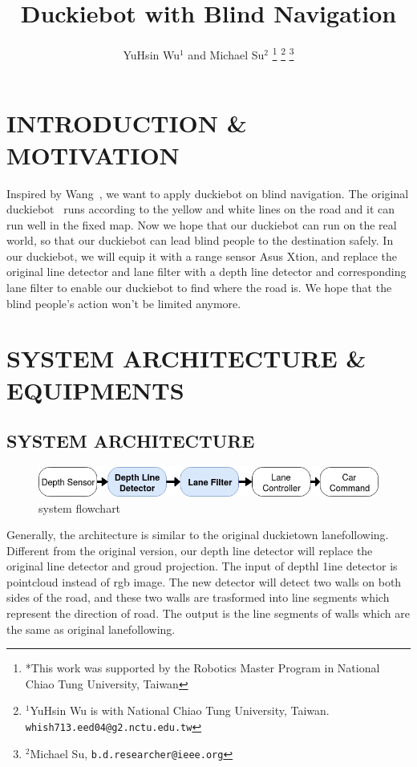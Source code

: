 \documentclass[letterpaper, 10 pt, conference]{ieeeconf}  %
\title{\LARGE \bf
Duckiebot with Blind Navigation
}
\author{YuHsin Wu$^{1}$ and Michael Su$^{2}$%
\thanks{*This work was supported by the Robotics Master Program in National Chiao Tung University, Taiwan}%
\thanks{$^{1}$YuHsin Wu is with National Chiao Tung University, Taiwan.
        {\tt\small whish713.eed04@g2.nctu.edu.tw}}%
\thanks{$^{2}$Michael Su,
        {\tt\small b.d.researcher@ieee.org}}%
}
\begin{document}
\maketitle
\thispagestyle{empty}
\pagestyle{empty}


\section{INTRODUCTION \& MOTIVATION}

Inspired by Wang~\cite{wang2017enabling}, we want to apply duckiebot on blind navigation. The original duckiebot~\cite{paull2017duckietown} runs according to the yellow and white lines on the road and it can run well in the fixed map. Now we hope that our duckiebot can run on the real world, so that our duckiebot can lead blind people to the destination safely. In our duckiebot, we will equip it with a range sensor Asus Xtion, and replace the original line detector and lane filter with a depth line detector and corresponding lane filter to enable our duckiebot to find where the road is. We hope that the blind people's action won't be limited anymore.

\section{SYSTEM ARCHITECTURE \& EQUIPMENTS}



\subsection{SYSTEM ARCHITECTURE}
\begin{figure}[h!] %
\includegraphics[width=1.0\columnwidth]{system_flowchart.png}
\centering
\caption{system flowchart}
\end{figure}

Generally, the architecture is similar to the original duckietown lanefollowing. Different from the original version, our depth line detector will replace the original line detector and groud projection. The input of depthl 1ine detector is pointcloud instead of rgb image. The new detector will detect two walls on both sides of the road, and these two walls are trasformed into line segments which represent the direction of road. The output is the line segments of walls which are the same as original lanefollowing. 
\end{document}
